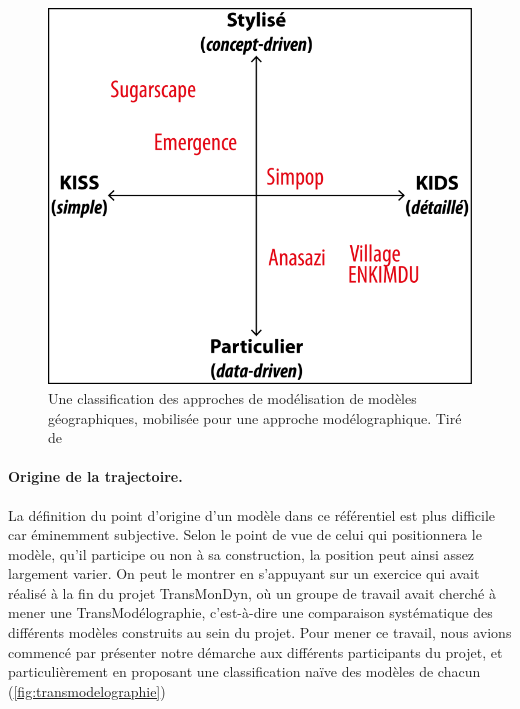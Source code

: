 \begin{figure}[H]
	\centering
	\includegraphics[width=.725\linewidth]{img/modelographie_fer-a-cheval.png}
	\caption[Une \og classification des approches de modélisation\fg{} de modèles géographiques.]{Une \og classification des approches de modélisation\fg{} de modèles géographiques, mobilisée pour une approche \og modélographique\fg{}.
	Tiré de \textcite[Figure 1]{schmitt_modelographie_2013}}
	\label{fig:modelographie}
\end{figure}


\paragraph{Origine de la trajectoire.}

La définition du point d'origine d'un modèle dans ce référentiel est plus difficile car éminemment subjective.
Selon le point de vue de celui qui positionnera le modèle, qu'il participe ou non à sa construction, la position peut ainsi assez largement varier.
On peut le montrer en s'appuyant sur un exercice qui avait réalisé à la fin du projet TransMonDyn, où un groupe de travail avait cherché à mener une \og TransModélographie\fg{}, c'est-à-dire une comparaison systématique des différents modèles construits au sein du projet.
Pour mener ce travail, nous avions commencé par présenter notre démarche aux différents participants du projet, et particulièrement en proposant une classification \og naïve\fg{} des modèles de chacun (\cref{fig:transmodelographie})

